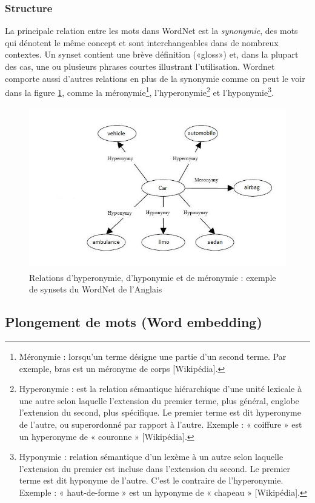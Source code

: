         \subsubsection{Structure}
        La principale relation entre les mots dans WordNet est la \emph{synonymie}, des mots qui dénotent le même concept et sont interchangeables dans de nombreux contextes. Un synset contient une brève définition («gloss») et, dans la plupart des cas, une ou plusieurs phrases courtes illustrant l'utilisation. Wordnet comporte aussi d'autres relations en plus de la synonymie comme on peut le voir dans la figure \ref{synset}, comme la méronymie\footnote{Méronymie : lorsqu'un terme désigne une partie d'un second terme. Par exemple, bras est un méronyme de corps [Wikipédia].}, l'hyperonymie\footnote{Hyperonymie : est la relation sémantique hiérarchique d'une unité lexicale à une autre selon laquelle l'extension du premier terme, plus général, englobe l'extension du second, plus spécifique. Le premier terme est dit hyperonyme de l'autre, ou superordonné par rapport à l'autre. Exemple : « coiffure » est un hyperonyme de « couronne » [Wikipédia].} et l'hyponymie\footnote{Hyponymie : relation sémantique d'un lexème à un autre selon laquelle l'extension du premier est incluse dans l'extension du second. Le premier terme est dit hyponyme de l'autre. C'est le contraire de l'hyperonymie. Exemple : « haut-de-forme » est un hyponyme de « chapeau » [Wikipédia].}. 
        \begin{figure}[H]
            \centering
                \includegraphics[height=200pt,width=330pt]{img/chapter2/wordnet.jpg}
            \caption{Relations d'hyperonymie, d'hyponymie et de méronymie : exemple de synsets du WordNet de l'Anglais \cite{synsetFigure}}
            \label{synset}
        \end{figure}
    
    
    \subsection{Plongement de mots (Word embedding)}
    
